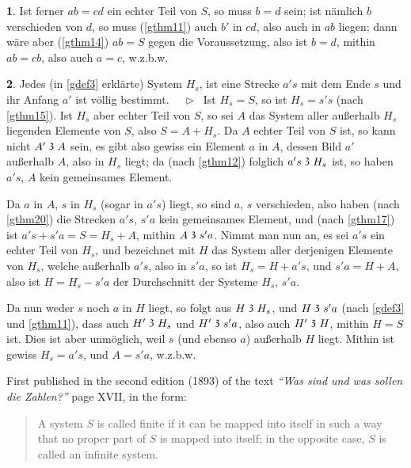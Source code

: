 \documentclass[leqno,hidelinks]{article}
\theoremstyle{definition}
\newtheorem{satz}{\protect\satzname}
\newcommand{\satzname}{}
\renewcommand{\satzname}{\hspace{-4pt}.\ Satz}%
\renewcommand{\satzname}{\hspace{-4pt}.\ Theorem}%
\newcommand\Beweis{\medskip \newline $ \phantom{'.'} \rhd \ $}%
\newcommand\TeilVon{\mathrel{\raisebox{0.45ex}{$\mathfrak{3}$}}}
\newcommand{\sref}[1]{\underline{\ref{#1}}}%
\begin{document}
\begin{paracol}{2}
\begin{satz}
Ist ferner $ab = cd$ ein echter Teil von $S$, so muss $b = d$ sein; ist nämlich
$b$ verschieden von $d$, so muss (\sref{gthm11}) auch $b'$ in $cd$, also auch in
$ab$ liegen; dann wäre aber (\sref{gthm14}) $ab = S$ gegen die Voraussetzung,
also ist $b = d$, mithin $ ab = cb$, also auch $a = c$, w.z.b.w.
\end{satz}

\begin{satz}\label{gthm27}
Jedes (in \sref{gdef3} erklärte) System $H_s$, ist eine Strecke $a's$ mit dem
Ende $s$ und ihr Anfang $a'$ ist völlig bestimmt.
\Beweis
Ist $H_s= S$, so ist $H_s= s's$ (nach \sref{gthm15}). Ist $H_s$ aber echter Teil
von $S$, so sei $A$ das System aller außerhalb $H_s$ liegenden Elemente von $S$,
also $S = A + H_s$. Da $A$ echter Teil von $S$ ist, so kann nicht $A' \TeilVon A$
sein, es gibt also gewiss ein Element $a$ in $A$, dessen Bild $a'$ außerhalb $A$,
also in $H_s$ liegt; da (nach \sref{gthm12}) folglich $a's \TeilVon H_s$ ist, so
haben $a's$, $A$ kein gemeinsames Element.

Da $a$ in  $A$, $s$ in $H_s$ (sogar in $a's$) liegt, so sind $a$, $s$ verschieden,
also haben (nach \sref{gthm20}) die Strecken $a's$, $s'a$ kein gemeinsames Element,
und (nach \sref{gthm17}) ist  $a's + s'a = S = H_s + A$, mithin $A \TeilVon s'a$.
Nimmt man nun an, es sei $a's$ ein echter Teil von $H_s$, und bezeichnet mit $H$
das System aller derjenigen Elemente von $H_s$, welche außerhalb $a's$, also in
$s'a$, so ist $H_s = H + a's$, und $s'a = H + A$, also ist $H = H_s - s'a$ der
Durchschnitt der Systeme $H_s$, $s'a$.

Da nun weder $s$ noch $a$ in $H$ liegt, so folgt aus $H \TeilVon H_s$, und
$H \TeilVon s'a$ (nach \sref{gdef3} und \sref{gthm11}), dass auch $H' \TeilVon H_s$
und $H' \TeilVon s'a$, also auch $H' \TeilVon H$, mithin $H = S$ ist. Dies ist
aber unmöglich, weil $s$ (und ebenso $a$) außerhalb $H$ liegt. Mithin ist gewiss
$H_s= a's$, und $A = s'a$, w.z.b.w.
\end{satz}




\switchcolumn
{}

\noindent First published in the second edition (1893) of the text
\textit{``Was sind und was sollen die Zahlen?''} page XVII, in the form:%

\begin{quote}
A system $S$ is called finite if it can be mapped into itself in such a way that
no proper part of $S$ is mapped into itself; in the opposite case, $S$ is called
an infinite system.
\end{quote}


\end{paracol}
\end{document}
